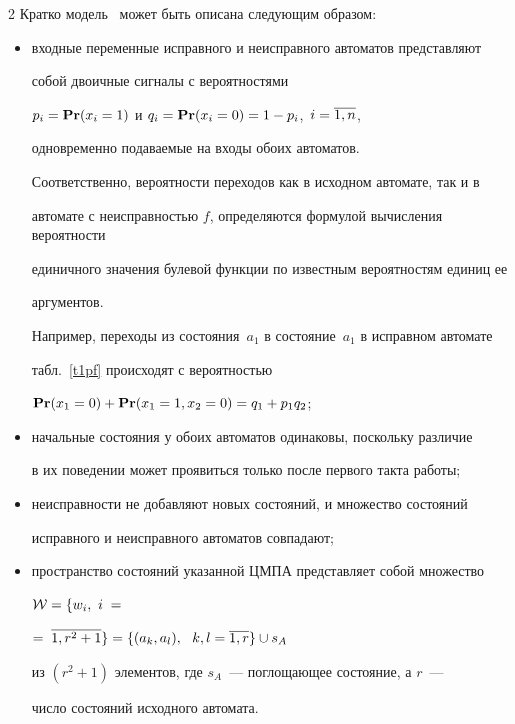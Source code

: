\begin{multicols}{2}
Кратко модель~\cite{4} может быть описана сле\-ду\-ющим образом:


\begin{itemize}


\item


 входные переменные исправного и неисправного автоматов представляют


собой двоичные сигналы с вероятностями


$p_i = {\bf Pr}(x_i=1)$ и $q_i = {\bf Pr}(x_i=0) = 1-p_i$,\ $i = \overline{1,n}$,


одновременно подаваемые на входы обоих автоматов.


Соответственно, вероятности переходов как в исходном автомате, так и в


автомате с неисправностью $f$, определяются формулой вы\-чис\-ле\-ния вероятности


единичного значения булевой функции по известным вероятностям единиц ее


аргументов.


Например, переходы из со\-сто\-яния~$a_1$ в со\-сто\-яние~$a_1$ в исправном автомате


табл.~\ref{t1pf} происходят с вероятностью


${\bf Pr}(x_1=0)+{\bf Pr}(x_1=1,x_2=0) = q_1+p_1 q_2$;


\item


 начальные состояния у обоих автоматов одинаковы, поскольку различие


в их поведении может проявиться только после первого такта работы;


\item


 неисправности не добавляют новых состояний, и множество состояний


исправного и неисправного автоматов совпадают;


\item


 пространство состояний указанной ЦМПА представляет собой множество


${\cal W} = \{w_i,\ i\;=$\linebreak


$=\;\o{1,r^2+1}\} = \{(a_k,a_l),\ \ k,l=\o{1,r}\}\cup s_A$


из $(r^2 + 1)$ элементов, где $s_A$~--- поглощающее состояние, а $r$~---


число состояний исходного автомата.



\end{itemize}
\end{multicols}
